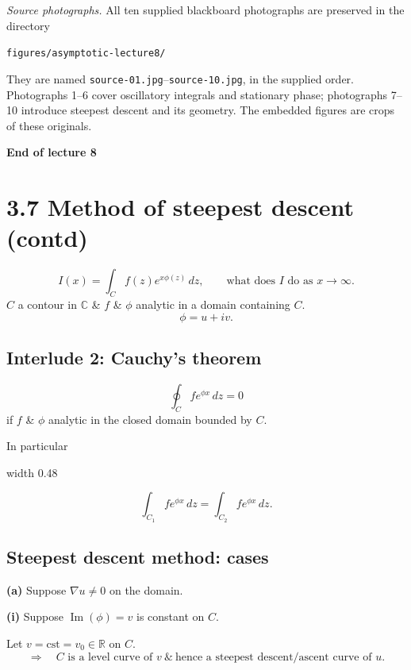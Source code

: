\documentclass[11pt,a4paper]{article}
\begin{document}
\medskip
\noindent\textit{Source photographs.}
All ten supplied blackboard photographs are preserved in the directory
\begin{center}
    \texttt{figures/asymptotic-lecture8/}
\end{center}
They are named \texttt{source-01.jpg}--\texttt{source-10.jpg}, in the supplied order.
Photographs 1--6 cover oscillatory integrals and stationary phase;
photographs 7--10 introduce steepest descent and its geometry.
The embedded figures are crops of these originals.

\begin{center}
    \textbf{End of lecture 8}
\end{center}

\clearpage
\section*{3.7 Method of steepest descent (contd)}

\[
    I(x)=\int_C f(z)e^{x\phi(z)}\,dz,
    \qquad \text{what does }I\text{ do as }x\to\infty.
\]
$C$ a contour in $\mathbb C$ \& $f$ \& $\phi$ analytic in a domain
containing $C$.
\[
    \phi=u+iv.
\]

\subsection*{Interlude 2: Cauchy's theorem}
\[
    \oint_C f e^{\phi x}\,dz=0
\]
if $f$ \& $\phi$ analytic in the closed domain bounded by $C$.

\medskip
\noindent In particular
\begin{center}
    \pdfximage width 0.48\linewidth {figures/asymptotic-lecture9/cauchy-contours.png}
    \leavevmode\pdfrefximage\pdflastximage
\end{center}
\[
    \int_{C_1}f e^{\phi x}\,dz
    =\int_{C_2}f e^{\phi x}\,dz.
\]

\subsection*{Steepest descent method: cases}
\noindent\textbf{(a)} Suppose $\nabla u\neq0$ on the domain.

\medskip
\noindent\textbf{(i)} Suppose $\operatorname{Im}(\phi)=v$ is constant on $C$.

Let $v=\mathrm{cst}=v_0\in\mathbb R$ on $C$.
\[
    \Rightarrow\quad C\text{ is a level curve of }v
    \ \&\ \text{hence a steepest descent/ascent curve of }u.
\]
\end{document}

